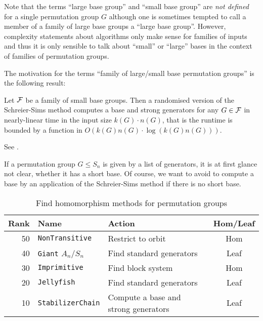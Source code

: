 \begin{Rem}
Note that the terms ``large base group'' and ``small base group'' are
\emph{not defined} for a single permutation group $G$ although one is
sometimes tempted to call a member of a family of large base groups
a ``large base group''. However, complexity statements about algorithms
only make sense for families of inputs and thus it is only sensible to
talk about ``small'' or ``large'' bases in the context of families of
permutation groups.
\end{Rem}

The motivation for the terms ``family of large/small base permutation
groups'' is the following result:

\begin{Theo}
Let $\mathcal{F}$ be a family of small base groups. Then a randomised version
of the Schreier-Sims method computes a base and strong generators
for any $G \in \mathcal{F}$ in nearly-linear time in the input size $k(G)\cdot
n(G)$, that is the runtime is bounded by a function in
$O(k(G)n(G) \cdot \log(k(G)n(G)))$.
\end{Theo}
\proofbeg See \cite[Chapter 2]{Ser}. \proofend

If a permutation group $G \le S_n$ is given by a list of generators, it
is at first glance not clear, whether it has a short base. Of course,
we want to avoid to compute a base by an application of the Schreier-Sims
method if there is no short base.

\begin{table}[ht]
\begin{center}
\begin{tabular}{|r|l|l|c|}
\hline
Rank & Name & Action & Hom/Leaf \\
\hline
\hline
50 & \texttt{NonTransitive} & Restrict to orbit & Hom \\
\hline
40 & \texttt{Giant} $A_n/S_n$ & Find standard generators & Leaf \\
\hline
30 & \texttt{Imprimitive} & Find block system & Hom \\
\hline
20 & \texttt{Jellyfish} & Find standard generators & Leaf \\
\hline
10 & \texttt{StabilizerChain} & Compute a base and strong generators & Leaf \\
\hline
\end{tabular}
\end{center}
\caption{Find homomorphism methods for permutation groups}
\label{permdb}
\end{table}

